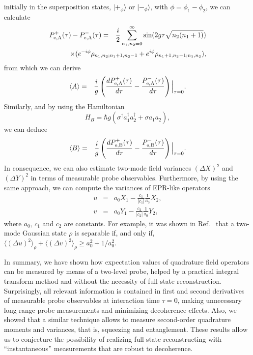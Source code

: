 \documentclass[pra,aps,twocolumn,showpacs]{revtex4}
\begin{document}
initially in the superposition states, $| +_{\phi} \rangle$ or $|
-_{\phi} \rangle$, with $\phi=\phi_{1}-\phi_{2}$, we can calculate
\begin{eqnarray}\label{prodif2m}
P^{+}_{\rm e,A}(\tau) - P^{-}_{\rm e,A}(\tau) & = &
\frac{i}{2}\sum^{\infty}_{n_{1},n_{2}=0}\sin(2g\tau\sqrt{n_{2}
(n_{1}+1)}) \nonumber\\ &  & \hspace*{-2.8cm} \times
(e^{-i\phi}\rho_{n_{1},n_{2};n_{1}+1,n_{2}-1} +
e^{i\phi}\rho_{n_{1}+1,n_{2}-1;n_{1},n_{2}}) ,
\end{eqnarray}
from which we can derive
\begin{eqnarray}
\label{Amean} \langle A \rangle & = &
\frac{i}{g}\left(\frac{dP^{+}_{\rm e,A}(\tau)}{d\tau} -
\frac{P^{-}_{\rm e,A}(\tau)}{d\tau}\right) \Big|_{\tau=0}.
\end{eqnarray}
Similarly, and by using the Hamiltonian
\begin{equation}\label{interHB}
H_{B} = \hbar g(\sigma^{\dagger}a_{1}^{\dagger}a_{2}^{\dagger} +
\sigma a_{1}a_{2}),
\end{equation}
we can deduce
\begin{eqnarray}\label{Bmean} \langle B \rangle & = &
\frac{i}{g}\left(\frac{dP^{+}_{\rm e,B}(\tau)}{d\tau} -
\frac{P^{-}_{\rm e,B}(\tau)}{d\tau}\right) \Big|_{\tau=0}.
\end{eqnarray}
In consequence, we can also estimate two-mode field variances
$(\Delta X)^{2}$ and $(\Delta Y)^{2}$ in terms of measurable probe
observables. Furthermore, by using the same approach, we can
compute the variances of EPR-like operators
\begin{eqnarray}
u & = & a_{0}X_{1} - \frac{c_{1}}{|c_{1}|}\frac{1}{a_{0}}X_{2} , \\
v & = & a_{0}Y_{1} - \frac{c_{2}}{|c_{2}|}\frac{1}{a_{0}}Y_{2},
\end{eqnarray}
where $a_{0}$, $c_{1}$ and $c_{2}$ are constants. For example, it
was shown in Ref.~\cite{Duan} that a two-mode Gaussian state
$\rho$ is separable if, and only if, $\langle (\Delta u)^{2}
\rangle_{\rho} + \langle (\Delta v)^{2} \rangle_{\rho} \ge a_{0}^2
+ 1 / a_{0}^2$.

In summary, we have shown how expectation values of quadrature
field operators can be measured by means of a two-level probe,
helped by a practical integral transform method and without the
necessity of full state reconstruction. Surprisingly, all relevant
information is contained in first and second derivatives of
measurable probe observables at interaction time $\tau = 0$,
making unnecessary long range probe measurements and minimizing
decoherence effects. Also, we showed that a similar technique
allows to measure second-order quadrature moments and variances,
that is, squeezing and entanglement. These results allow us to
conjecture the possibility of realizing full state reconstructing
with ``instantaneous'' measurements that are robust to
decoherence.
\end{document}
